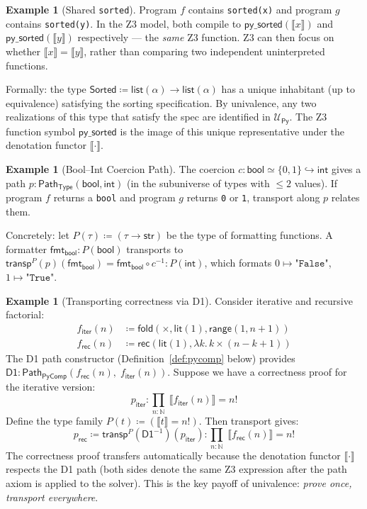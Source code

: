 \documentclass[11pt,a4paper]{report}
\theoremstyle{definition}
\newtheorem{example}[definition]{Example}
\theoremstyle{plain}
\newcommand{\den}[1]{\llbracket #1 \rrbracket}
\newcommand{\Path}{\mathsf{Path}}
\newcommand{\Nat}{\mathbb{N}}
\newcommand{\Type}{\mathsf{Type}}
\newcommand{\fold}{\mathsf{fold}}
\newcommand{\rec}{\mathsf{rec}}
\newcommand{\transp}{\mathsf{transp}}
\begin{document}
\begin{example}[Shared \texttt{sorted}]
\label{ex:shared-sorted}
Program $f$ contains \texttt{sorted(x)} and program $g$ contains
\texttt{sorted(y)}.  In the Z3 model, both compile to
$\mathsf{py\_sorted}(\den{x})$ and $\mathsf{py\_sorted}(\den{y})$
respectively --- the \emph{same} Z3 function.  Z3 can then focus on
whether $\den{x} = \den{y}$, rather than comparing two independent
uninterpreted functions.

Formally: the type $\mathsf{Sorted} \coloneqq
\mathsf{list}(\alpha) \to \mathsf{list}(\alpha)$ has a unique
inhabitant (up to equivalence) satisfying the sorting specification.
By univalence, any two realizations of this type that satisfy the
spec are identified in $\mathcal{U}_{\mathsf{Py}}$.  The Z3 function
symbol $\mathsf{py\_sorted}$ is the image of this unique representative
under the denotation functor $\den{\cdot}$.
\end{example}

\begin{example}[Bool--Int Coercion Path]
\label{ex:bool-int}
The coercion $c : \mathsf{bool} \simeq \{0, 1\} \hookrightarrow
\mathsf{int}$ gives a path $p : \Path_\Type(\mathsf{bool},
\mathsf{int})$ (in the subuniverse of types with $\leq 2$ values).
If program $f$ returns a \texttt{bool} and program $g$ returns
\texttt{0} or \texttt{1}, transport along $p$ relates them.

Concretely: let $P(\tau) \coloneqq (\tau \to \mathsf{str})$ be the
type of formatting functions.  A formatter
$\mathsf{fmt}_{\mathsf{bool}} : P(\mathsf{bool})$ transports to
$\transp^P(p)(\mathsf{fmt}_{\mathsf{bool}}) = \mathsf{fmt}_{\mathsf{bool}} \circ c^{-1}
: P(\mathsf{int})$, which formats $0 \mapsto \texttt{"False"}$,
$1 \mapsto \texttt{"True"}$.
\end{example}

\begin{example}[Transporting correctness via D1]
\label{ex:transport-d1}
Consider iterative and recursive factorial:
\begin{align*}
  f_{\mathsf{iter}}(n) &\coloneqq \fold(\times, \mathsf{lit}(1), \mathsf{range}(1, n+1)) \\
  f_{\mathsf{rec}}(n) &\coloneqq \rec(\mathsf{lit}(1), \lambda k.\, k \times (n-k+1))
\end{align*}
The D1 path constructor (Definition~\ref{def:pycomp} below) provides
$\mathsf{D1} : \Path_{\mathsf{PyComp}}(f_{\mathsf{rec}}(n),\; f_{\mathsf{iter}}(n))$.
Suppose we have a correctness proof for the iterative version:
\[
  p_{\mathsf{iter}} : \prod_{n : \Nat}\; \den{f_{\mathsf{iter}}(n)} = n!
\]
Define the type family $P(t) \coloneqq (\den{t} = n!)$.
Then transport gives:
\[
  p_{\mathsf{rec}} \coloneqq \transp^P(\mathsf{D1}^{-1})(p_{\mathsf{iter}})
  : \prod_{n : \Nat}\; \den{f_{\mathsf{rec}}(n)} = n!
\]
The correctness proof transfers automatically because the denotation
functor $\den{\cdot}$ respects the D1 path (both sides denote the
same Z3 expression after the path axiom is applied to the solver).
This is the key payoff of univalence: \emph{prove once, transport everywhere}.
\end{example}
\end{document}
